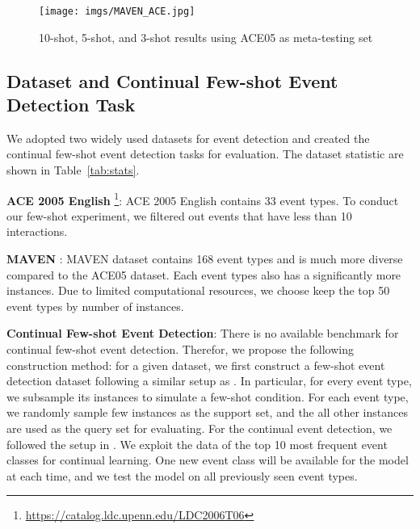 


\begin{figure*}[ht]
\centering
    \texttt{[image: imgs/MAVEN\_ACE.jpg]}
    \caption{10-shot, 5-shot, and 3-shot results using ACE05 as meta-testing set}
    \label{img:result_ACE}
\end{figure*}
  
\subsection{Dataset and Continual Few-shot Event Detection Task}
We adopted two widely used datasets for event detection and created the continual few-shot event detection tasks for evaluation. The dataset statistic are shown in Table~\ref{tab:stats}.

\noindent
\textbf{ACE 2005 English} \footnote{\url{https://catalog.ldc.upenn.edu/LDC2006T06}}: ACE 2005 English contains 33 event types.  To conduct our few-shot experiment, we filtered out events that have less than 10 interactions.

\noindent
\textbf{MAVEN} \citep{wang2020MAVEN}: MAVEN dataset contains 168 event types and is much more diverse compared to the ACE05 dataset. Each event types also has a significantly more instances.  Due to limited computational resources,  we choose keep the top 50 event types by number of instances.  

\noindent
\textbf{Continual Few-shot Event Detection}: There is no available benchmark for continual few-shot event detection. Therefor, we propose the following construction method: for a given dataset,  we first construct a few-shot event detection dataset following a similar setup as \citep{chen2021honey}.  In particular,  for every event type,  we subsample its instances to simulate a few-shot condition.  For each event type, we randomly sample few instances as the support set, and the all other instances are used as the query set for evaluating.  For the continual event detection,  we followed the setup in \citep{cao2020incremental}.  We exploit the data of the top 10 most frequent event classes for continual learning. One new event class will be available for the model at each time, and we test the model on all previously seen event types. 


